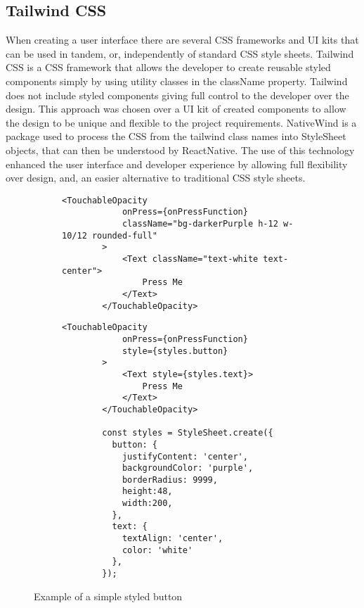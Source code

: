 \subsection{Tailwind CSS}
When creating a user interface there are several CSS frameworks and UI kits that can be used in tandem, or, independently of standard CSS style sheets. Tailwind CSS \cite{tailwind} is a CSS framework that allows the developer to create reusable styled components simply by using utility classes in the className property. Tailwind does not include styled components giving full control to the developer over the design. This approach was chosen over a UI kit of created components to allow the design to be unique and flexible to the project requirements. NativeWind \cite{nativewind} is a package used to process the CSS from the tailwind class names into StyleSheet objects, that can then be understood by ReactNative. The use of this technology enhanced the user interface and developer experience by allowing full flexibility over design, and, an easier alternative to traditional CSS style sheets. 
\begin{figure}[!htbp]
    \centering
    \begin{subfigure}[b]{0.42\textwidth}
        \begin{lstlisting}[language=jsJsx, caption={Styled using Tailwind CSS}]
        <TouchableOpacity
            onPress={onPressFunction}
            className="bg-darkerPurple h-12 w-10/12 rounded-full"
        >
            <Text className="text-white text-center">
                Press Me
            </Text>
        </TouchableOpacity>
        \end{lstlisting}
    \end{subfigure}
    \hspace{2em}
    \begin{subfigure}[b]{0.45\textwidth}
        \begin{lstlisting}[language=jsJsx, caption={Styled using a traditional StyleSheet}]
        <TouchableOpacity
            onPress={onPressFunction}
            style={styles.button}
        >
            <Text style={styles.text}>
                Press Me
            </Text>
        </TouchableOpacity>
            
        const styles = StyleSheet.create({
          button: {
            justifyContent: 'center',
            backgroundColor: 'purple',
            borderRadius: 9999,
            height:48,
            width:200,
          },
          text: {
            textAlign: 'center',
            color: 'white'
          },
        });
        \end{lstlisting}
    \end{subfigure}
    \caption{Example of a simple styled button}
    \label{fig:tailwind}
\end{figure}
\FloatBarrier

